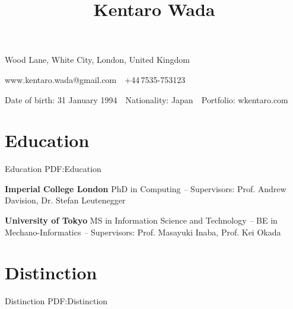 \documentclass[letterpaper,MMMyyyy,nonstop]{simpleresumecv}
\newcommand{\CVAuthor}{Kentaro Wada}
\newcommand{\CVWebpage}{wkentaro.com}
\begin{document}

\title{\CVAuthor}

\begin{subtitle}
Wood Lane, White City, London, United Kingdom
\par
www.kentaro.wada@gmail.com
\,\SubBulletSymbol\,
+44\,7535-753123
\par
Date of birth: 31 January 1994
\,\SubBulletSymbol\,
Nationality: Japan
\,\SubBulletSymbol\,
Portfolio: \CVWebpage

\noindent\makebox[\linewidth]{\rule{0.8\paperwidth}{0.4pt}}
\end{subtitle}

\begin{body}


\section
{Education}
{Education}
{PDF:Education}

\textbf{Imperial College London}
\newline
PhD in Computing
\hfill
{\it {} -- }
\newline
Supervisors: Prof. Andrew Davision, Dr. Stefan Leutenegger

\GapNoBreak

\textbf{University of Tokyo}
\newline
MS in Information Science and Technology
\hfill
{\it {} -- }
\newline
BE in Mechano-Informatics
\hfill
{\it {} -- }
\newline
Supervisors: Prof. Masayuki Inaba, Prof. Kei Okada


%


\section
{Distinction}
{Distinction}
{PDF:Distinction}


\end{body}
\end{document}

